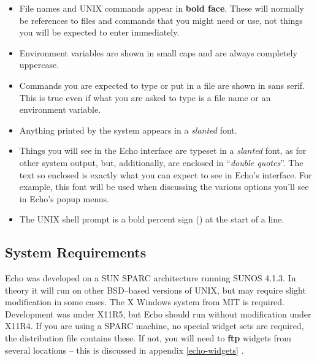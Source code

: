 \begin{itemize}

\item
{}
File names and UNIX commands appear in {\bf bold face}. These will
normally be references to files and commands that you might need or
use, not things you will be expected to enter immediately.

\item
{}
Environment variables are shown in {\sc small caps} and are always
completely {\sc uppercase}.

\item
Commands you are expected to type or put in a file are shown in {\sf
sans serif}. This is true even if what you are asked to type is a file
name or an environment variable.

\item
Anything printed by the system appears in a {\sl slanted} font.

\item
Things you will see in the Echo interface are typeset in a {\sl
slanted} font, as for other system output, but, additionally, are
enclosed in ``{\sl double quotes}''. The text so enclosed is exactly
what you can expect to see in Echo's interface. For example, this font
will be used when discussing the various options you'll see in Echo's
popup menus.

\item
{}
The UNIX shell prompt is a bold percent sign (\prompt) at the start
of a line.

\end{itemize}


\subsection{System Requirements}

Echo was developed on a SUN SPARC architecture running SUNOS 4.1.3. In
theory it will run on other BSD--based versions of UNIX, but may
require slight modification in some cases. The X Windows  system from MIT is required. Development was under X11R5, but
Echo should run without modification under X11R4. If you are using a
SPARC machine, no special widget sets  are required,
the distribution file contains these. If not, you will need to {\bf
ftp} widgets from several locations -- this is discussed in appendix
\ref{echo-widgets} .

